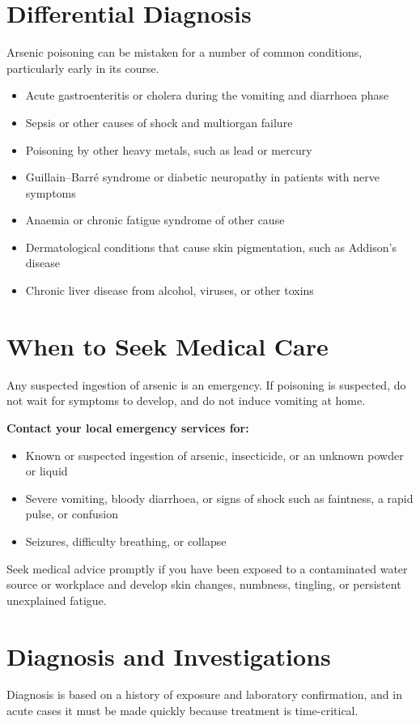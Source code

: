 \section*{Differential Diagnosis}
Arsenic poisoning can be mistaken for a number of common conditions, particularly early in its course.

\begin{itemize}
    \item Acute gastroenteritis or cholera during the vomiting and diarrhoea phase
    \item Sepsis or other causes of shock and multiorgan failure
    \item Poisoning by other heavy metals, such as lead or mercury
    \item Guillain--Barré syndrome or diabetic neuropathy in patients with nerve symptoms
    \item Anaemia or chronic fatigue syndrome of other cause
    \item Dermatological conditions that cause skin pigmentation, such as Addison's disease
    \item Chronic liver disease from alcohol, viruses, or other toxins
\end{itemize}

\section*{When to Seek Medical Care}
Any suspected ingestion of arsenic is an emergency. If poisoning is suspected, do not wait for symptoms to develop, and do not induce vomiting at home.

\textbf{Contact your local emergency services for:}
\begin{itemize}
    \item Known or suspected ingestion of arsenic, insecticide, or an unknown powder or liquid
    \item Severe vomiting, bloody diarrhoea, or signs of shock such as faintness, a rapid pulse, or confusion
    \item Seizures, difficulty breathing, or collapse
\end{itemize}

Seek medical advice promptly if you have been exposed to a contaminated water source or workplace and develop skin changes, numbness, tingling, or persistent unexplained fatigue.

\section*{Diagnosis and Investigations}
Diagnosis is based on a history of exposure and laboratory confirmation, and in acute cases it must be made quickly because treatment is time-critical.

